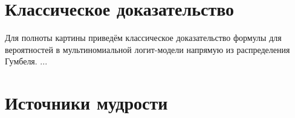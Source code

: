 \documentclass[12pt]{article}
\begin{document}
\section*{Классическое доказательство}

Для полноты картины приведём классическое доказательство формулы для вероятностей в мультиномиальной логит-модели напрямую из распределения Гумбеля. 
...



\section{Источники мудрости}

\printbibliography
\end{document}
